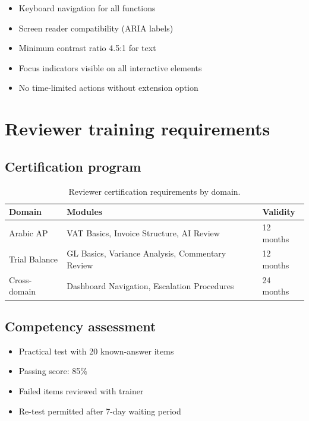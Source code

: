 \begin{itemize}
  \item Keyboard navigation for all functions
  \item Screen reader compatibility (ARIA labels)
  \item Minimum contrast ratio 4.5:1 for text
  \item Focus indicators visible on all interactive elements
  \item No time-limited actions without extension option
\end{itemize}

\section{Reviewer training requirements}

\subsection{Certification program}

\begin{table}[htbp]
\centering
\caption{Reviewer certification requirements by domain.}
\label{tab:certification}
\footnotesize
\begin{tabularx}{\linewidth}{@{}l l X@{}}
\toprule
\textbf{Domain} & \textbf{Modules} & \textbf{Validity} \\ \midrule
Arabic AP & VAT Basics, Invoice Structure, AI Review & 12 months \\
Trial Balance & GL Basics, Variance Analysis, Commentary Review & 12 months \\
Cross-domain & Dashboard Navigation, Escalation Procedures & 24 months \\
\bottomrule
\end{tabularx}
\end{table}

\subsection{Competency assessment}

\begin{itemize}
  \item Practical test with 20 known-answer items
  \item Passing score: 85\%
  \item Failed items reviewed with trainer
  \item Re-test permitted after 7-day waiting period
\end{itemize}

